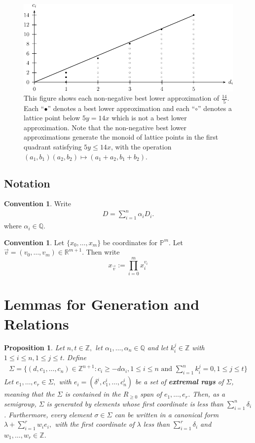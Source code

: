 \documentclass{amsart}
\theoremstyle{plain}
\newtheorem{prop}[thm]{Proposition}
\theoremstyle{definition}
\newtheorem{convention}[thm]{Convention}
\theoremstyle{remark}
\numberwithin{equation}{section}
\newcommand\ssec{\subsection}
\newcommand\br{{\mathbb R}}
\newcommand\bq{{\mathbb Q}}
\newcommand\bp{{\mathbb P}}
\newcommand\bz{{\mathbb Z}}
\newcommand\pdeg{\delta}
\begin{document}
\begin{figure}
\includegraphics{pics/spin-lower-approximations-pic-pics.pdf}
\caption{This figure shows each non-negative best lower
approximation of $\frac{14}{5}.$ Each ``$\bullet$'' denotes a best
lower approximation and each ``$\circ$'' denotes a lattice point
below $5y=14x$ which is not a best lower approximation.  Note that
the non-negative best lower approximations generate the monoid of
lattice points in the first quadrant satisfying  $5y \le 14x$, with
the operation $(a_1, b_1)(a_2, b_2)\mapsto (a_1 + a_2, b_1 + b_2)$.}
\label{fig:s14/5-lattice}
\end{figure}

\ssec{Notation}
\begin{convention}
Write
\begin{align*}
	D = \sum_{i=1}^{n}\alpha_i D_i.
\end{align*}
where $\alpha_i \in \bq$.
\end{convention}

\begin{convention}
Let $\{x_0, \ldots, x_m\}$ be coordinates for $\bp^m$. Let
$\vec{v} = (v_0, \ldots, v_m) \in \br^{m + 1}$. Then write
\[
	x_{\vec{v}} := \prod_{i = 0}^{m} x_i^{v_i}
\]
\end{convention}

\section{Lemmas for Generation and Relations}

\begin{prop}
\label{prop:cone-generation}
Let $n,t \in \bz,$ let $\alpha_1, \ldots, \alpha_n \in \bq$ and let $k_i^j \in \bz$ with $1 \leq i \leq n, 1 \leq j \leq t.$ Define
\begin{align*}
	\Sigma = \{(d, c_1, \ldots, c_n) \in \bz^{n+1} : c_i \geq - d \alpha_i,1 \leq i \leq n \text{ and } \sum_{i=1}^{n}k_i^j = 0, 1 \leq j \leq t\}
\end{align*}
Let $e_1, \ldots, e_r \in \Sigma,$ with $e_i = (\pdeg^i, c_1^i, \ldots, c_n^i)$ be a set of {\bf extremal rays} of $\Sigma$, meaning that the $\Sigma$ is contained in the $R_{\geq 0}$ span of $e_1, \ldots, e_r$.  Then, as a semigroup, $\Sigma$ is generated by elements whose first coordinate is less than $\sum_{i=1}^{n}\pdeg_i$. Furthermore, every element $\sigma \in \Sigma$ can be written in a canonical form $\lambda + \sum_{i=1}^{r} w_i e_i,$ with the first coordinate of $\lambda$ less than $\sum_{i=1}^{r}\pdeg_i$ and $w_1,\ldots, w_r \in \bz$.

\end{prop}
\end{document}
